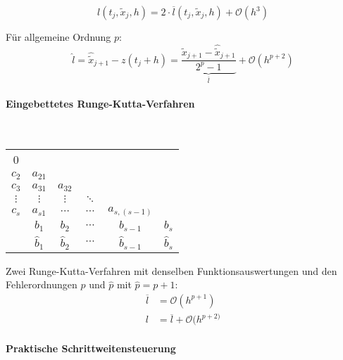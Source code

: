 				\[
					l(t_j,\tilde x_j, h) = 2\cdot \overline{l}(t_j,\tilde x_j, h) + \mathcal{O}\left( h^3\right)
				\]
				
				Für allgemeine Ordnung $p$:
				\[
					\hat l = \hat{\tilde{x}}_{j+1} - z(t_j + h) = \underbrace{\frac{\tilde x_{j+1} - \hat{\tilde{x}}_{j+1}}{2^p - 1}}_{\overline{l}} + \mathcal{O}\left( h^{p+2}\right)
				\]
				
			\paragraph{Eingebettetes Runge-Kutta-Verfahren} ~
				
				\hspace{5ex}
				\begin{tabular}
					{c|ccccc} 0 & & & & & \\
					$c_2$ & $a_{21}$ & & & & \\
					$c_3$ & $a_{31}$ & $a_{32}$ & & & \\
					$\vdots$ & $\vdots$ & $\vdots$ & $\ddots$ & & \\
					$c_s$ & $a_{s1}$ & $\cdots$ & $\cdots$ & $a_{s,(s-1)}$ & \\
					\hline & $b_1$ & $b_2$ & $\cdots$ & $b_{s-1}$ & $b_s$\\
					\hline & $\hat b_1$ & $\hat b_2$ & $\cdots$ & $\hat b_{s-1}$ & $\hat b_s$\\
				\end{tabular}

				Zwei Runge-Kutta-Verfahren mit denselben Funktionsauswertungen und den Fehlerordnungen $p$ und $\hat p$ mit $\hat p = p+1$:
				\begin{align*}
					\overline{l} &= \mathcal{O}\left( h^{p+1}\right) \\
					l &= \overline{l}+ \mathcal{O}(h^{p+2)}
				\end{align*}
			
			\paragraph{Praktische Schrittweitensteuerung} ~
			
